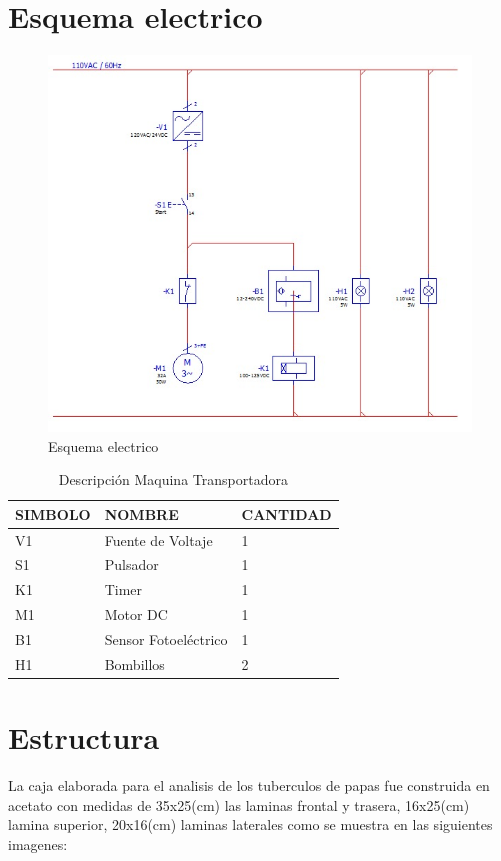	\section{Esquema electrico}
		\begin{figure}[ht]
			\centering
			\includegraphics[scale=0.5]{Figs/66.jpg}
			\caption{Esquema electrico}
			\label{fig:Esquema}
		\end{figure}
	
		\begin{table}[ht]
		\centering
		\begin{tabular}{|p{2cm}|p{5cm}||p{3cm}|}
			\hline
			SIMBOLO & NOMBRE & CANTIDAD \\ 
			\hline
			 V1 & Fuente de Voltaje & 1 \\
			\hline
			 S1 & Pulsador & 1 \\
			\hline
			 K1 & Timer & 1 \\
			\hline
			 M1 & Motor DC & 1 \\
			\hline
			 B1 & Sensor Fotoeléctrico & 1 \\
			\hline
			 H1 & Bombillos & 2 \\
			\hline
		\end{tabular}	
		\caption{Descripción Maquina Transportadora}
		\label{table:Banda}
		\end{table}	
		
\newpage	
	\section{Estructura}
		La caja elaborada para el analisis de los tuberculos de papas fue construida en acetato con medidas de 35x25(cm) las laminas frontal y trasera, 16x25(cm) lamina superior, 20x16(cm) laminas laterales como se muestra en las siguientes imagenes:
	
